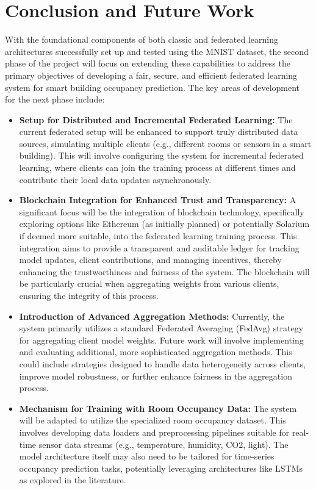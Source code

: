 \chapter{Conclusion and Future Work}

With the foundational components of both classic and federated learning architectures successfully set up and tested using the MNIST dataset, the second phase of the project will focus on extending these capabilities to address the primary objectives of developing a fair, secure, and efficient federated learning system for smart building occupancy prediction. The key areas of development for the next phase include:

\begin{itemize}
    \item \textbf{Setup for Distributed and Incremental Federated Learning:}
    The current federated setup will be enhanced to support truly distributed data sources, simulating multiple clients (e.g., different rooms or sensors in a smart building). This will involve configuring the system for incremental federated learning, where clients can join the training process at different times and contribute their local data updates asynchronously.

    \item \textbf{Blockchain Integration for Enhanced Trust and Transparency:}
    A significant focus will be the integration of blockchain technology, specifically exploring options like Ethereum (as initially planned) or potentially Solarium if deemed more suitable, into the federated learning training process. This integration aims to provide a transparent and auditable ledger for tracking model updates, client contributions, and managing incentives, thereby enhancing the trustworthiness and fairness of the system. The blockchain will be particularly crucial when aggregating weights from various clients, ensuring the integrity of this process.

    \item \textbf{Introduction of Advanced Aggregation Methods:}
    Currently, the system primarily utilizes a standard Federated Averaging (FedAvg) strategy for aggregating client model weights. Future work will involve implementing and evaluating additional, more sophisticated aggregation methods. This could include strategies designed to handle data heterogeneity across clients, improve model robustness, or further enhance fairness in the aggregation process.

    \item \textbf{Mechanism for Training with Room Occupancy Data:}
    The system will be adapted to utilize the specialized room occupancy dataset. This involves developing data loaders and preprocessing pipelines suitable for real-time sensor data streams (e.g., temperature, humidity, CO2, light). The model architecture itself may also need to be tailored for time-series occupancy prediction tasks, potentially leveraging architectures like LSTMs as explored in the literature.


\end{itemize}
